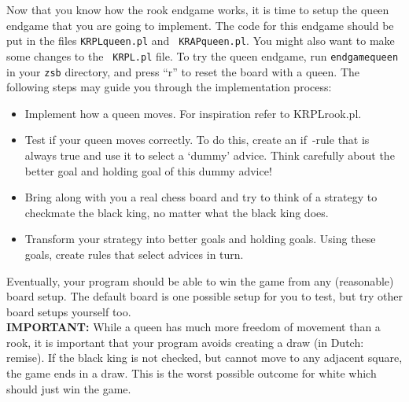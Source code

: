 \documentclass[10pt]{scrartcl}
\begin{document}
Now that you know how the rook endgame works, it is time to setup
the queen endgame that you are going to implement. The code for
this endgame should be put in the files {\tt KRPLqueen.pl} and {\tt
KRAPqueen.pl}.  You might also want to make some changes to the {\tt
KRPL.pl} file. To try the queen endgame, run {\tt endgamequeen} in your
{\tt zsb} directory, and press ``r'' to reset the board with a queen.
The following steps may guide you through the implementation process:
\begin{itemize}
\item Implement how a queen moves. For inspiration refer to KRPLrook.pl.
\item Test if your queen moves correctly.
      To do this, create an if~-rule that is always true and use
      it to select a `dummy' advice. Think carefully about the better
      goal and holding goal of this dummy advice!
\item Bring along with you a real chess board and try to think of a strategy 
      to checkmate the black king, no matter what the black king does.
\item Transform your strategy into better goals and holding goals. Using
      these goals, create rules that select advices in turn.
\end{itemize}

Eventually, your program should be able to win the game from any (reasonable) board setup.
The default board is one possible setup for you to test,
but try other board setups yourself too.
\\

 {\bf IMPORTANT:} While a queen has much more freedom of movement than a rook, it is
 important that your program avoids creating a draw (in Dutch: remise). If the black king is not
 checked, but cannot move to any adjacent square, the game ends in a draw. This
 is the worst possible outcome for white which should just win the game.


\end{document}
